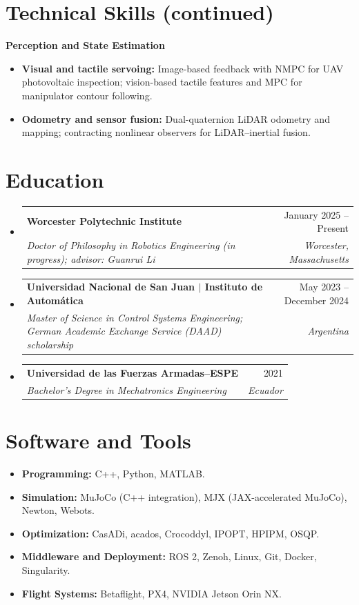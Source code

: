 \documentclass[letterpaper,11pt]{article}
\makeatletter
\newcommand{\resumeSubheading}[4]{
  \vspace{-2pt}\item
    \begin{tabularx}{0.97\textwidth}[t]{@{}X@{\hspace{10pt}}r@{}}
      \textbf{#1} & #2 \\
      \textit{\small#3} & \textit{\small #4} \\
    \end{tabularx}\vspace{-7pt}
}
\newcommand{\resumeSubHeadingListStart}{\begin{itemize}[leftmargin=0.15in, label={}, itemsep=6pt, topsep=3pt, parsep=0pt]}
\newcommand{\resumeSubHeadingListEnd}{\end{itemize}}
\makeatother
\begin{document}
\section{Technical Skills (continued)}
{\small\textbf{Perception and State Estimation}\par}
\begin{itemize}[leftmargin=0.22in, itemsep=2pt, parsep=0pt, topsep=4pt]
\small
\item \textbf{Visual and tactile servoing:} Image-based feedback with NMPC for UAV photovoltaic inspection; vision-based tactile features and MPC for manipulator contour following.
\item \textbf{Odometry and sensor fusion:} Dual-quaternion LiDAR odometry and mapping; contracting nonlinear observers for LiDAR--inertial fusion.
\end{itemize}

\section{Education}
\resumeSubHeadingListStart
\resumeSubheading{Worcester Polytechnic Institute}{January 2025 -- Present}
{Doctor of Philosophy in Robotics Engineering (in progress); advisor: Guanrui Li}{Worcester, Massachusetts}
\resumeSubheading{Universidad Nacional de San Juan $|$ Instituto de Autom\'atica}{May 2023 -- December 2024}
{Master of Science in Control Systems Engineering; German Academic Exchange Service (DAAD) scholarship}{Argentina}
\resumeSubheading{Universidad de las Fuerzas Armadas--ESPE}{2021}
{Bachelor's Degree in Mechatronics Engineering}{Ecuador}
\resumeSubHeadingListEnd

\section{Software and Tools}
\begin{itemize}[leftmargin=0.15in, label={}, itemsep=1pt, parsep=0pt, topsep=3pt]
\small
\item \textbf{Programming:} C++, Python, MATLAB.
\item \textbf{Simulation:} MuJoCo (C++ integration), MJX (JAX-accelerated MuJoCo), Newton, Webots.
\item \textbf{Optimization:} CasADi, acados, Crocoddyl, IPOPT, HPIPM, OSQP.
\item \textbf{Middleware and Deployment:} ROS 2, Zenoh, Linux, Git, Docker, Singularity.
\item \textbf{Flight Systems:} Betaflight, PX4, NVIDIA Jetson Orin NX.
\end{itemize}
\end{document}
